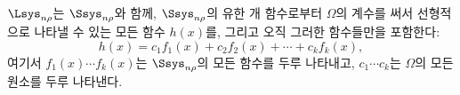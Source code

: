 
$\Lsys_{n\rho}$는 $\Ssys_{n\rho}$와 함께, $\Ssys_{n\rho}$의 유한 개 함수로부터 $\Omega$의 계수를 써서 선형적으로 나타낼 수 있는 모든 함수 $h(x)$를, 그리고 오직 그러한 함수들만을 포함한다:
\[
h(x)=c_1f_1(x)+c_2f_2(x)+\cdots+c_kf_k(x),
\]
여기서 $f_1(x)\cdots f_k(x)$는 $\Ssys_{n\rho}$의 모든 함수를 두루 나타내고, $c_1\cdots c_k$는 $\Omega$의 모든 원소를 두루 나타낸다.
